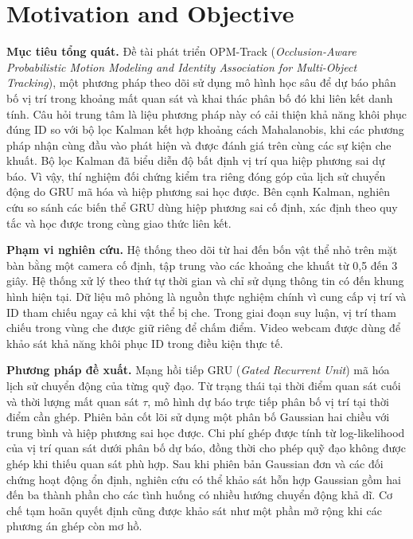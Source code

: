 \section{Motivation and Objective}
\label{sec:motivation_objective}

\textbf{Mục tiêu tổng quát.} Đề tài phát triển OPM-Track (\textit{Occlusion-Aware Probabilistic Motion Modeling and Identity Association for Multi-Object Tracking}), một phương pháp theo dõi sử dụng mô hình học sâu để dự báo phân bố vị trí trong khoảng mất quan sát và khai thác phân bố đó khi liên kết danh tính. Câu hỏi trung tâm là liệu phương pháp này có cải thiện khả năng khôi phục đúng ID so với bộ lọc Kalman kết hợp khoảng cách Mahalanobis, khi các phương pháp nhận cùng đầu vào phát hiện và được đánh giá trên cùng các sự kiện che khuất. Bộ lọc Kalman đã biểu diễn độ bất định vị trí qua hiệp phương sai dự báo. Vì vậy, thí nghiệm đối chứng kiểm tra riêng đóng góp của lịch sử chuyển động do GRU mã hóa và hiệp phương sai học được. Bên cạnh Kalman, nghiên cứu so sánh các biến thể GRU dùng hiệp phương sai cố định, xác định theo quy tắc và học được trong cùng giao thức liên kết.

\textbf{Phạm vi nghiên cứu.} Hệ thống theo dõi từ hai đến bốn vật thể nhỏ trên mặt bàn bằng một camera cố định, tập trung vào các khoảng che khuất từ 0,5 đến 3 giây. Hệ thống xử lý theo thứ tự thời gian và chỉ sử dụng thông tin có đến khung hình hiện tại. Dữ liệu mô phỏng là nguồn thực nghiệm chính vì cung cấp vị trí và ID tham chiếu ngay cả khi vật thể bị che. Trong giai đoạn suy luận, vị trí tham chiếu trong vùng che được giữ riêng để chấm điểm. Video webcam được dùng để khảo sát khả năng khôi phục ID trong điều kiện thực tế.

\textbf{Phương pháp đề xuất.} Mạng hồi tiếp GRU (\textit{Gated Recurrent Unit}) mã hóa lịch sử chuyển động của từng quỹ đạo. Từ trạng thái tại thời điểm quan sát cuối và thời lượng mất quan sát $\tau$, mô hình dự báo trực tiếp phân bố vị trí tại thời điểm cần ghép. Phiên bản cốt lõi sử dụng một phân bố Gaussian hai chiều với trung bình và hiệp phương sai học được. Chi phí ghép được tính từ log-likelihood của vị trí quan sát dưới phân bố dự báo, đồng thời cho phép quỹ đạo không được ghép khi thiếu quan sát phù hợp. Sau khi phiên bản Gaussian đơn và các đối chứng hoạt động ổn định, nghiên cứu có thể khảo sát hỗn hợp Gaussian gồm hai đến ba thành phần cho các tình huống có nhiều hướng chuyển động khả dĩ. Cơ chế tạm hoãn quyết định cũng được khảo sát như một phần mở rộng khi các phương án ghép còn mơ hồ.


